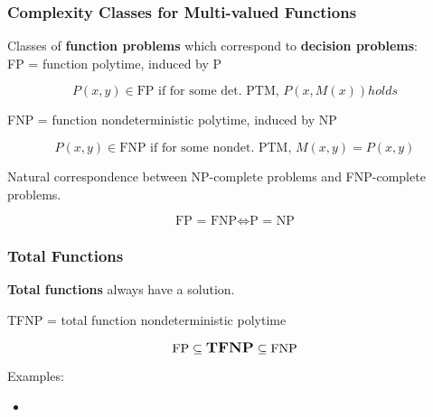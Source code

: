 \documentclass[10pt]{beamer}
\begin{document}
\begin{frame}
\frametitle{Complexity Classes for Multi-valued Functions}

Classes of \textbf{function problems} which correspond to
\textbf{decision problems}:\\

FP = function polytime, induced by P

\begin{displaymath}
P(x,y) \in \textrm{FP} \textrm{ if for some det. PTM, } P(x,M(x)) holds
\end{displaymath}

FNP = function nondeterministic polytime, induced by NP

\begin{displaymath}
\displaystyle
P(x,y) \in \textrm{FNP} \textrm{ if for some nondet. PTM, } M(x,y) = P(x,y)
\end{displaymath}

Natural correspondence between NP-complete problems and FNP-complete problems.


\begin{displaymath}
\textrm{FP = FNP} \Leftrightarrow \textrm{P = NP}
\end{displaymath}

\end{frame}

\begin{frame}
\frametitle{Total Functions}

\textbf{Total functions} always have a solution.

TFNP = total function nondeterministic polytime

\begin{displaymath}
\textrm{FP} \subseteq \textrm{\large{\textbf{TFNP}}} \subseteq \textrm{FNP}
\end{displaymath}

Examples:
\begin{itemize}
\item
\end{itemize}

\end{frame}
\end{document}
